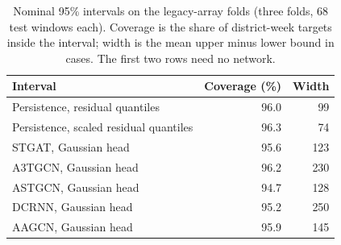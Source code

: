 \begin{table}[t]
\centering
\caption{Nominal 95\% intervals on the legacy-array folds (three folds, 68 test windows each). Coverage is the share of district-week targets inside the interval; width is the mean upper minus lower bound in cases. The first two rows need no network.}
\label{tab:interval}
\footnotesize
\begin{tabular}{@{}lrr@{}}
\toprule
Interval & Coverage (\%) & Width \\
\midrule
Persistence, residual quantiles & 96.0 & 99 \\ %
Persistence, scaled residual quantiles & 96.3 & 74 \\ %
\midrule
STGAT, Gaussian head & 95.6 & 123 \\ %
A3TGCN, Gaussian head & 96.2 & 230 \\ %
ASTGCN, Gaussian head & 94.7 & 128 \\ %
DCRNN, Gaussian head & 95.2 & 250 \\ %
AAGCN, Gaussian head & 95.9 & 145 \\ %
\bottomrule
\end{tabular}
\end{table}
